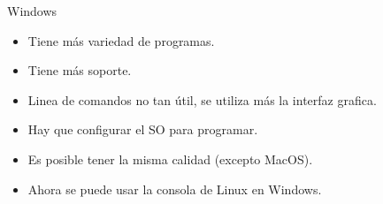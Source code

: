 \documentclass[10pt,xcolor={dvipsnames}]{beamer}
\begin{document}
\begin{frame}{Windows}
\begin{center}
\begin{itemize}
\item<3-|alert@3> Tiene más variedad de programas.
\item<4-|alert@4> Tiene más soporte.
\item<5-|alert@5> Linea de comandos no tan útil, se utiliza más la interfaz grafica.
\item<6-|alert@6> Hay que configurar el SO para programar.
\item<7-|alert@7> Es posible tener la misma calidad (excepto MacOS).
\item<8-|alert@8> Ahora se puede usar la consola de Linux en Windows.
\end{itemize}
\end{center}
\end{frame}
\end{document}
